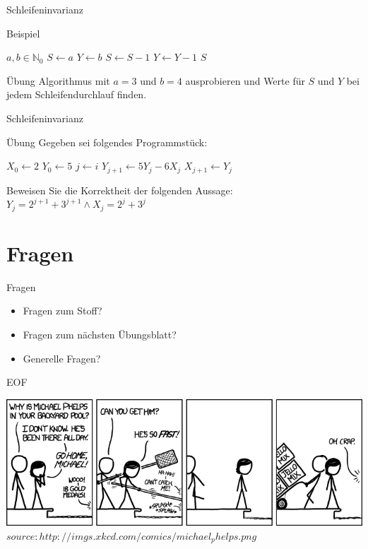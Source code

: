 	
	\begin{frame}{Schleifeninvarianz}
   		\begin{block}{Beispiel}
            \begin{algorithmic}
                \Require $a, b \in \mathbb{N}_0$
                \State $S \gets a$
                \State $Y \gets b$
                    \State $ S \gets S - 1$
                    \State $Y \gets Y -1$
                \EndFor
                \Ensure $S$
            \end{algorithmic}
    	\end{block}
    	
    	\pause
    	
    	\begin{exampleblock}{Übung}
        	Algorithmus mit $a = 3$ und $b = 4$ ausprobieren und Werte für $S$ 
        	und $Y$ bei jedem Schleifendurchlauf finden.
    	\end{exampleblock}
	\end{frame}
	
	
	\begin{frame}{Schleifeninvarianz}
		\begin{exampleblock}{Übung}
			Gegeben sei folgendes Programmstück:\\
			\begin{algorithmic}
				\State $X_0 \gets 2$
				\State $Y_0 \gets 5$
					\State $j \gets i$
					\State $Y_{j+1} \gets 5Y_j - 6X_j$
					\State $X_{j+1} \gets Y_j$
				\EndFor
			\end{algorithmic}
			\vspace{10pt}
			Beweisen Sie die Korrektheit der folgenden Aussage:\\
			$Y_j=2^{j+1}+3^{j+1} \land X_j = 2^j + 3^j$
		\end{exampleblock}
	\end{frame}
	
	
	
	\section{Fragen}
	\begin{frame} {Fragen}
		\begin{itemize}
			\item Fragen zum Stoff?
			\item Fragen zum n\"achsten \"Ubungsblatt?
			\item Generelle Fragen?
		\end{itemize}
	\end{frame}

		
	\begin{frame} {EOF}
		\begin{center}
			\includegraphics[scale=0.4]{graphics/eof4.png}\\
			\tiny $source: http://imgs.xkcd.com/comics/michael_phelps.png$
		\end{center}
	\end{frame}


